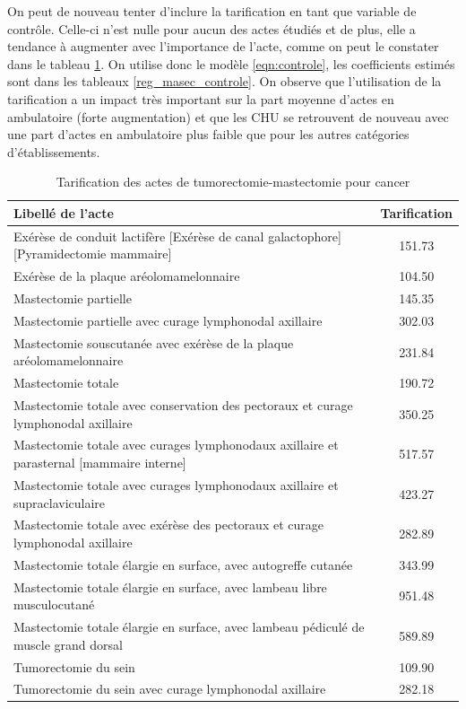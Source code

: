 \clearpage

On peut de nouveau tenter d'inclure la tarification en tant que variable de contrôle. Celle-ci n'est nulle pour aucun des actes étudiés et de plus, elle a tendance à augmenter avec l'importance de l'acte, comme on peut le constater dans le tableau \ref{tarif_masec}. On utilise donc le modèle \ref{eqn:controle}, les coefficients estimés sont dans les tableaux \ref{reg_masec_controle}. On observe que l'utilisation de la tarification a un impact très important sur la part moyenne d'actes en ambulatoire (forte augmentation) et que les CHU se retrouvent de nouveau avec une part d'actes en ambulatoire plus faible que pour les autres catégories d'établissements. \\

\begin{table}[ht]
\centering
\caption{Tarification des actes de tumorectomie-mastectomie pour cancer} 
\label{tarif_masec}
\begin{tabular}{l|c}
  \hline
  Libellé de l'acte & Tarification\\
  \hline
Exérèse de conduit lactifère [Exérèse de canal galactophore] [Pyramidectomie mammaire] & 151.73\\
Exérèse de la plaque aréolomamelonnaire & 104.50\\
Mastectomie partielle & 145.35\\
Mastectomie partielle avec curage lymphonodal axillaire & 302.03\\
Mastectomie souscutanée avec exérèse de la plaque aréolomamelonnaire & 231.84\\
Mastectomie totale & 190.72\\
Mastectomie totale avec conservation des pectoraux et curage lymphonodal axillaire & 350.25\\
Mastectomie totale avec curages lymphonodaux axillaire et parasternal [mammaire interne] 
& 517.57\\
Mastectomie totale avec curages lymphonodaux axillaire et supraclaviculaire & 423.27\\
Mastectomie totale avec exérèse des pectoraux et curage lymphonodal axillaire & 282.89\\
Mastectomie totale élargie en surface, avec autogreffe cutanée & 343.99\\
Mastectomie totale élargie en surface, avec lambeau libre musculocutané & 951.48\\
Mastectomie totale élargie en surface, avec lambeau pédiculé de muscle grand dorsal & 589.89\\
Tumorectomie du sein & 109.90\\
Tumorectomie du sein avec curage lymphonodal axillaire  & 282.18\\
   \hline
\end{tabular}
\end{table}


